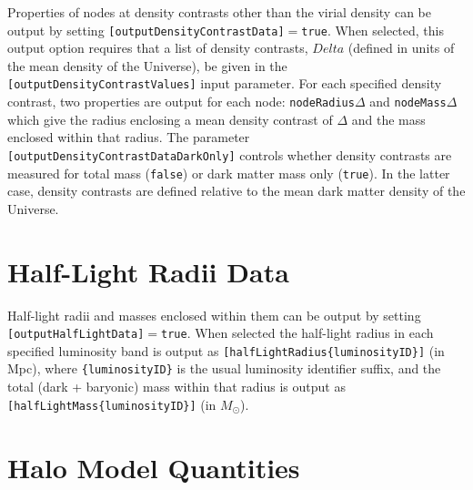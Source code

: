 Properties of nodes at density contrasts other than the virial density can be output by setting {\tt [outputDensityContrastData]}$=${\tt true}. When selected, this output option requires that a list of density contrasts, $Delta$ (defined in units of the mean density of the Universe), be given in the {\tt [outputDensityContrastValues]} input parameter. For each specified density contrast, two properties are output for each node: {\tt nodeRadius}$\Delta$ and {\tt nodeMass}$\Delta$ which give the radius enclosing a mean density contrast of $\Delta$ and the mass enclosed within that radius. The parameter {\tt [outputDensityContrastDataDarkOnly]} controls whether density contrasts are measured for total mass ({\tt false}) or dark matter mass only ({\tt true}). In the latter case, density contrasts are defined relative to the mean dark matter density of the Universe.

\section{Half-Light Radii Data}

Half-light radii and masses enclosed within them can be output by setting {\tt [outputHalfLightData]}$=${\tt true}. When selected the half-light radius in each specified luminosity band is output as {\tt [halfLightRadius\{luminosityID\}]} (in Mpc), where {\tt\{luminosityID\}} is the usual luminosity identifier suffix, and the total (dark + baryonic) mass within that radius is output as {\tt [halfLightMass\{luminosityID\}]} (in $M_\odot$).

\section{Halo Model Quantities}\label{sec:HaloModelOutput}

